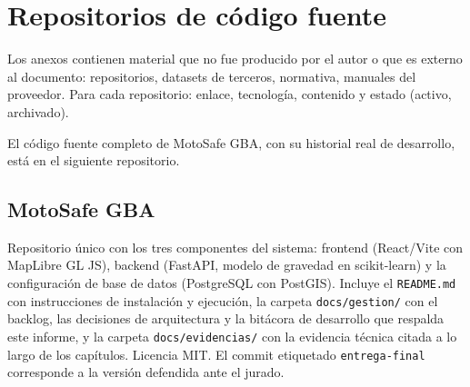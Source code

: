 
\chapter{Repositorios de código fuente}\label{anx:repositorios}

\begin{guia}
Los anexos contienen material que no fue producido por el autor o que
es externo al documento: repositorios, datasets de terceros, normativa,
manuales del proveedor. Para cada repositorio: enlace, tecnología,
contenido y estado (activo, archivado).
\end{guia}

El código fuente completo de MotoSafe GBA, con su historial real de
desarrollo, está en el siguiente repositorio.

\section{MotoSafe GBA}


Repositorio único con los tres componentes del sistema: frontend
(React/Vite con MapLibre GL JS), backend (FastAPI, modelo de gravedad
en scikit-learn) y la configuración de base de datos (PostgreSQL con
PostGIS). Incluye el \texttt{README.md} con instrucciones de
instalación y ejecución, la carpeta \texttt{docs/gestion/} con el
backlog, las decisiones de arquitectura y la bitácora de desarrollo que
respalda este informe, y la carpeta \texttt{docs/evidencias/} con la
evidencia técnica citada a lo largo de los capítulos. Licencia MIT. El
commit etiquetado \texttt{entrega-final} corresponde a la versión
defendida ante el jurado.
